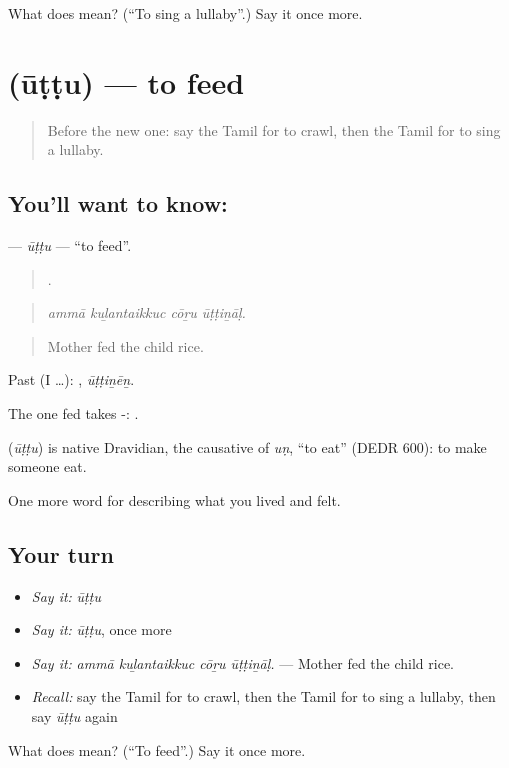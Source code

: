 \begin{tcolorbox}[breakable,colback=teal!4,colframe=teal!35!black,title={Before you move on}]
What does  mean? (\textquotedblleft{}To sing a lullaby\textquotedblright{}.) Say it once more.
\end{tcolorbox}
\section[\texorpdfstring{\ta{ஊட்டு} (ūṭṭu)}{ஊட்டு (ūṭṭu)}]{ (ūṭṭu) — to feed}

\label{lesson:TA-C495-uttu}



\begin{quote}
Before the new one: say the Tamil for to crawl, then the Tamil for to sing a lullaby.
\end{quote}

\subsection*{You'll want to know: }
\textbf{} — \emph{ūṭṭu} — \textquotedblleft{}to feed\textquotedblright{}.

\begin{quote}
   .
\end{quote}

\begin{quote}
\emph{ammā kuḻantaikkuc cōṟu ūṭṭiṉāḷ.}
\end{quote}

\begin{quote}
Mother fed the child rice.
\end{quote}

Past (I …): , \emph{ūṭṭiṉēṉ}.

The one fed takes -:  .

\begin{cousinweb}
\textbf{} (\emph{ūṭṭu}) is native Dravidian, the causative of  \emph{uṇ}, \textquotedblleft{}to eat\textquotedblright{} (DEDR 600): to make someone eat.
\end{cousinweb}

\begin{grammarlens}[title={What you've built}]
One more word for describing what you lived and felt.
\end{grammarlens}

\subsection*{Your turn}
\begin{itemize}
\raggedright
  \item \emph{Say it:} \emph{ūṭṭu}
  \item \emph{Say it:} \emph{ūṭṭu}, once more
  \item \emph{Say it:} \emph{ammā kuḻantaikkuc cōṟu ūṭṭiṉāḷ.} — Mother fed the child rice.
  \item \emph{Recall:} say the Tamil for to crawl, then the Tamil for to sing a lullaby, then say \emph{ūṭṭu} again
\end{itemize}

\begin{tcolorbox}[breakable,colback=teal!4,colframe=teal!35!black,title={Before you move on}]
What does  mean? (\textquotedblleft{}To feed\textquotedblright{}.) Say it once more.
\end{tcolorbox}
